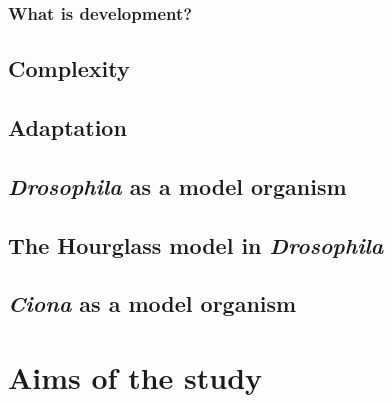 \documentclass[officiallayout]{tktla_modified}
\begin{document}



\subsection*{What is development?}
	
	
%	
	
%	
\section{Complexity}
	
\section{Adaptation}
	
\section{\textit{Drosophila} as a model organism}
	
\section{The Hourglass model in \textit{Drosophila} }
	
\section{\textit{Ciona} as a model organism}
	
	\clearpage

\chapter{Aims of the study}

\end{document}
